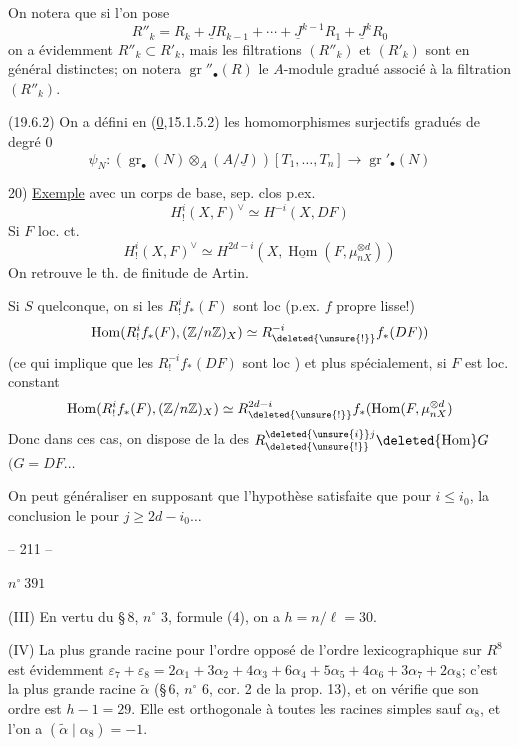 {On notera que si l'on pose
\[
R''_k=R_k+\underline JR_{k-1}+\cdots+\underline J^{k-1}R_1+\underline J^kR_0
\]
on a évidemment $R''_k\subset R'_k$, mais les filtrations $(R''_k)$ et $(R'_k)$ sont en général distinctes; on notera $\operatorname{gr}''_\bullet(R)$ le $A$-module gradué associé à la filtration $(R''_k)$.

(19.6.2) On a défini en (\uline{0},15.1.5.2) les homomorphismes surjectifs gradués de degré $0$
\[
\psi_N:(\operatorname{gr}_\bullet(N)\otimes_A(A/\underline J))[T_1,\ldots,T_n]\longrightarrow\operatorname{gr}'_\bullet(N)
\]
}

20) \uline{Exemple}  avec un corps de base, sep. clos p.ex.
\[
H^i_!(X,F)^\vee\simeq H^{-i}(X,DF)
\]
Si $F$ loc. ct.
\[
H^i_!(X,F)^\vee\simeq H^{2d-i}(X,\underline{\operatorname{Hom}}(F,\mu_{nX}^{\otimes d}))
\]
On retrouve le th. de finitude de Artin.

Si $S$ quelconque, on  si les $R^i_!f_*(F)$ sont loc  (p.ex. $f$ propre lisse!)
\[
\operatorname{Hom}(R^i_!f_*(F),(\mathbb Z/n\mathbb Z)_X)\simeq R^{-i}_{\deleted{\unsure{!}}}f_*(DF))
\]
(ce qui implique que les $R^{-i}_!f_*(DF)$ sont loc ) et plus spécialement, si $F$ est loc. constant
\[
\operatorname{Hom}(R^i_!f_*(F),(\mathbb Z/n\mathbb Z)_X)\simeq R^{2d-i}_{\deleted{\unsure{!}}}f_*(\operatorname{Hom}(F,\mu_{nX}^{\otimes d})
\]
Donc dans ces cas, on dispose de la  des $R^{\deleted{\unsure{i}}j}_{\deleted{\unsure{!}}}\deleted{\operatorname{Hom}}G$ $(G=DF\ldots$

On peut généraliser en supposant que l'hypothèse  satisfaite que pour $i\leq i_0$, la conclusion le  pour $j\geq2d-i_0\ldots$

\begin{center}-- 211 --\end{center}
\begin{flushright}$n^\circ\ 391$\end{flushright}

(III) En vertu du \S\,8, $n^\circ$ 3, formule (4), on a $h=n/\ell=30$.

(IV) La plus grande racine pour l'ordre opposé de l'ordre lexicographique sur $R^8$ est évidemment $\varepsilon_7+\varepsilon_8=2\alpha_1+3\alpha_2+4\alpha_3+6\alpha_4+5\alpha_5+4\alpha_6+3\alpha_7+2\alpha_8$; c'est la plus grande racine $\widetilde\alpha$ (\S\,6, $n^\circ$ 6, cor. 2 de la prop. 13), et on vérifie que son ordre est $h-1=29$. Elle est orthogonale à toutes les racines simples sauf $\alpha_8$, et l'on a $(\widetilde\alpha\mid\alpha_8)=-1$.


